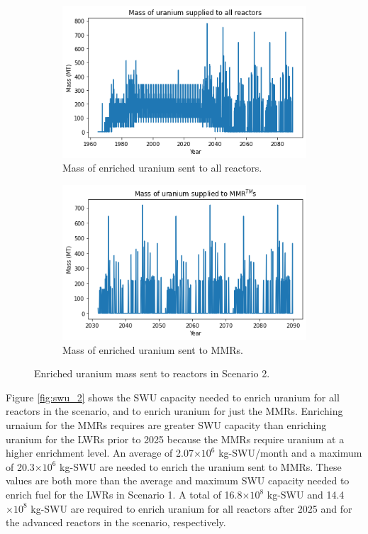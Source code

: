 \begin{figure}
    \centering
    \begin{subfigure}{0.45\textwidth}
        \centering
        \includegraphics[scale=0.4]{../figures/fuelsupply_scenarios_2.png}
        \caption{Mass of enriched uranium sent to all reactors.}
        \label{fig:totalfuel_2}
    \end{subfigure}
    \hspace{0.8cm}
    \begin{subfigure}{0.45\textwidth}
        \centering
        \includegraphics[scale=0.4]{../figures/advancedRX_fuelsupply_scenarios_2.png}
        \caption{Mass of enriched uranium sent to \glspl{MMR}.}
        \label{fig:haleu_2}
    \end{subfigure}
    \caption{Enriched uranium mass sent to reactors in Scenario 2.}
    \label{fig:fuel_2}
\end{figure}

Figure \ref{fig:swu_2} shows the \gls{SWU} capacity needed to 
enrich uranium for all reactors in the scenario, and to enrich uranium for 
just the \glspl{MMR}. Enriching urnaium for the \glspl{MMR} requires are 
greater \gls{SWU} capacity than enriching uranium for the \glspl{LWR} 
prior to 2025 because the \glspl{MMR} require uranium at a higher enrichment 
level. An average of 2.07$\times 10^6$ 
kg-\gls{SWU}/month
and a maximum of 20.3$\times 10^6$ kg-\gls{SWU}
are needed to enrich the uranium sent to \glspl{MMR}. These values are both 
more than the 
average and maximum \gls{SWU} capacity needed to enrich fuel for the 
\glspl{LWR} in Scenario 1. A total of 16.8$\times 10^8$ kg-SWU and 14.4$\times 
10^8$ kg-SWU are required to enrich uranium for all reactors after 2025 and for 
the advanced reactors in the scenario, respectively. 

